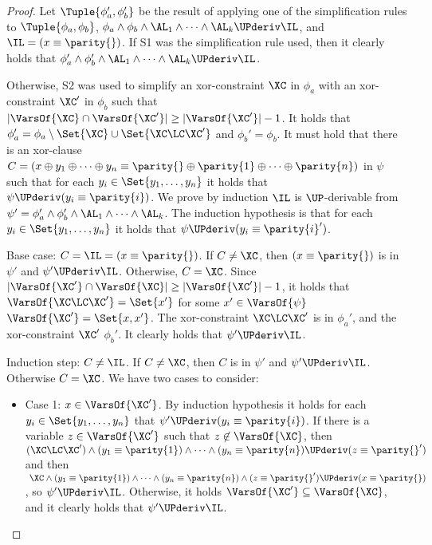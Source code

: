 \begin{proof}
Let $ \Tuple{\phi_a', \phi_b'} $ be the result of applying one of the
simplification rules to $ \Tuple{\phi_a, \phi_b}$, $ \phi_a \wedge \phi_b
\wedge \AL_1 \wedge \dots \wedge \AL_k \UPderiv \IL $, and $ \IL = (x \equiv \parity{})$.
If S1 was the simplification rule used, then it clearly
holds that $ \phi_a' \wedge \phi_b' \wedge \AL_1 \wedge \dots \wedge \AL_k \UPderiv \IL $.

Otherwise, S2 was used to simplify an xor-constraint $ \XC$ in $\phi_a $ with
an xor-constraint $ \XC' $ in $ \phi_b $ such that $ |\VarsOf{\XC} \cap \VarsOf{\XC'}|
\geq |\VarsOf{\XC'}| - 1$.
It holds that $ \phi_a' = \phi_a \setminus \Set{\XC} \cup \Set{\XC \LC \XC'} $
and $ \phi_b' = \phi_b $.
It must hold that there is an xor-clause $ C = (x \oplus y_1 \oplus \dots
\oplus y_n \equiv \parity{} \oplus \parity{1} \oplus \dots \oplus
\parity{n}) $ in $ \psi $ such that for each $y_i \in \Set{y_1, \dots,
y_n} $ it holds that $ \psi \UPderiv (y_i \equiv \parity{i}) $.
We prove by induction $ \IL $ is $\UP$-derivable from $ \psi' = \phi_a' \wedge
\phi_b' \wedge \AL_1 \wedge \dots \wedge \AL_k $.
The induction hypothesis is that for each $y_i \in \Set{y_1, \dots, y_n} $ it
holds that $ \psi \UPderiv (y_i \equiv \parity{i}') $.

Base case: $C = \IL = (x \equiv \parity{})$. If $ C \not = \XC $, then $ (x \equiv \parity{}) $ is in $ \psi' $ and $ \psi' \UPderiv \IL $. Otherwise, $ C = \XC $.
Since $ |\VarsOf{\XC'} \cap \VarsOf{\XC}| \geq |\VarsOf{\XC'}| - 1$, it holds that
$\VarsOf{\XC \LC \XC'} = \Set{x'} $ for some $x' \in \VarsOf{\psi} $
$ \VarsOf{\XC'} = \Set{x, x'} $.
The xor-constraint $ \XC \LC \XC'$ is in $ \phi_a' $, and the
xor-constraint $\XC'$ $\phi_b' $.
It clearly holds that $ \psi' \UPderiv \IL $.

Induction step: $C \not = \IL$. If $ C \not = \XC $, then $ C $ is in $ \psi'$
and $ \psi' \UPderiv \IL$. Otherwise $ C = \XC $.
We have two cases to consider:
\begin{itemize}
\item Case 1: $ x \in \VarsOf{\XC'} $.
By induction hypothesis it holds for each $ y_i \in \Set{y_1, \dots, y_n} $
that $ \psi' \UPderiv (y_i \equiv \parity{i}) $.
If there is a variable $z \in \VarsOf{\XC'}$ such that $ z \not \in
\VarsOf{\XC} $, then $ (\XC \LC \XC') \wedge (y_1 \equiv \parity{1}) \wedge \dots \wedge (y_n \equiv \parity{n}) \UPderiv (z \equiv \parity{}') $ and then
$ \XC \wedge (y_1 \equiv \parity{1}) \wedge \dots \wedge (y_n \equiv \parity{n}) \wedge (z \equiv \parity{}') \UPderiv (x \equiv \parity{}) $, so $ \psi' \UPderiv \IL $.
Otherwise, it holds $ \VarsOf{\XC'} \subseteq \VarsOf{\XC} $, and it clearly holds that $ \psi' \UPderiv \IL $.


\end{itemize}
\end{proof}
